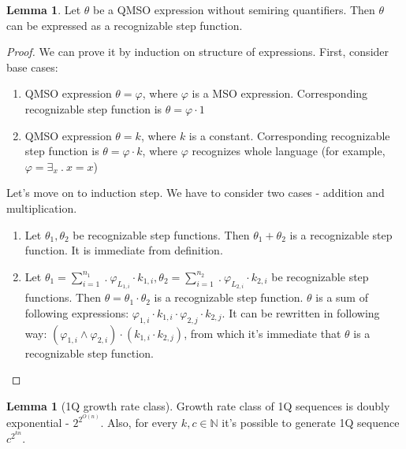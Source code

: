 \documentclass[12pt]{article}
\theoremstyle{definition}
\newtheorem{lemma}[theorem]{Lemma}
\begin{document}
\begin{lemma}
    \label{QFreeRecognizable}
    Let $\theta$ be a QMSO expression without semiring quantifiers. Then $\theta$ can be expressed as a recognizable step function.
\end{lemma}

\begin{proof}
    We can prove it by induction on structure of expressions.
    First, consider base cases:
    \begin{enumerate}
        \item QMSO expression $\theta = \varphi$, where $\varphi$ is a MSO expression. Corresponding recognizable step function is $\theta = \varphi \cdot 1$
        \item QMSO expression $\theta = k$, where $k$ is a constant. Corresponding recognizable step function is $\theta = \varphi \cdot k$, where $\varphi$ recognizes whole language (for example, $\varphi = \exists_x \ . \ x = x$)
    \end{enumerate}

    Let's move on to induction step. We have to consider two cases - addition and multiplication.
    \begin{enumerate}
        \item Let $\theta_1, \theta_2$ be recognizable step functions. Then $\theta_1 + \theta_2$ is a recognizable step function. It is immediate from definition.
        \item Let $\theta_1 = \sum_{i = 1}^{n_1} \ . \ \varphi_{L_{1,i}} \cdot k_{1,i}, \theta_2 = \sum_{i = 1}^{n_2} \ . \ \varphi_{L_{2,i}} \cdot k_{2,i}$ be recognizable step functions. Then $\theta = \theta_1 \cdot \theta_2$ is a recognizable step function. $\theta$ is a sum of following expressions: $\varphi_{1,i} \cdot k_{1, i} \cdot \varphi_{2,j} \cdot k_{2,j}$. It can be rewritten in following way: $(\varphi_{1,i} \land \varphi_{2,i}) \cdot (k_{1,i} \cdot k_{2,j})$, from which it's immediate that $\theta$ is a recognizable step function.
    \end{enumerate}
    
\end{proof}

\begin{lemma}[1Q growth rate class]
    Growth rate class of 1Q sequences is doubly exponential - $2^{2^{O(n)}}$. Also, for every $k, c \in \mathbb{N}$ it's possible to generate 1Q sequence $c^{2^{kn}}$.
\end{lemma}
\end{document}
